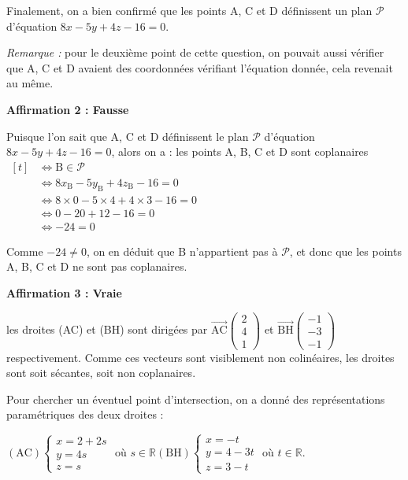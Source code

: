 \documentclass[10pt]{article}
\providecommand{\R}{\mathbb{R}}
\providecommand{\vect}[1]{\overrightarrow{#1}}
\begin{document}
Finalement, on a bien confirmé que les points A, C et D définissent un plan $\mathcal{P}$ d'équation $8 x-5 y+4 z-16=0$.

\emph{Remarque :} pour le deuxième point de cette question, on pouvait aussi vérifier que A, C et D avaient des coordonnées vérifiant l'équation donnée, cela revenait au même.

\medskip

\textbf{Affirmation 2 : Fausse}

Puisque l'on sait que A, C et D définissent le plan $\mathcal{P}$ d'équation $8x-5y+4z-16 = 0$, alors on a :
les points A, B, C et D sont coplanaires $\begin{aligned}[t] &\iff \mathrm{B} \in \mathcal{P}\\
&\iff 8x_\mathrm{B}-5y_\mathrm{B}+4z_\mathrm{B}-16 =0\\
&\iff 8\times 0 - 5\times 4 + 4\times 3 - 16 = 0\\
&\iff 0 - 20 + 12 - 16 = 0\\
&\iff -24 = 0\end{aligned}$

Comme $-24\neq 0$, on en déduit que B n'appartient pas à $\mathcal{P}$, et donc que les points A, B, C et D ne sont pas coplanaires.

\medskip

\textbf{Affirmation 3 : Vraie}

les droites (AC) et (BH) sont dirigées par $\vect{\mathrm{AC}}  \begin{pmatrix} 2\\4\\1 \end{pmatrix}$ et $\vect{\mathrm{BH}} \begin{pmatrix} -1\\-3\\-1 \end{pmatrix}$ respectivement. Comme ces vecteurs sont visiblement non colinéaires, les droites sont soit sécantes, soit non coplanaires.

Pour chercher un éventuel point d'intersection, on a donné des représentations paramétriques des deux droites :

$(\mathrm{AC}) \begin{cases} x = 2+2s\\y = 4s\\z = s \end{cases}$ où $s\in \R$\qquad $(\mathrm{BH})\begin{cases} x =  - t\\y = 4 - 3t\\z=3 - t\end{cases}$ où $t\in \R$.
\end{document}
